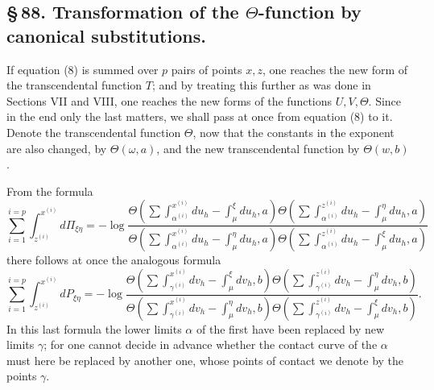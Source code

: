 \documentclass[10pt]{article}
\begin{document}
\subsection*{\S\,88. Transformation of the \(\Theta\)-function by canonical substitutions.}

If equation (8) is summed over \(p\) pairs of points \(x,z\), one reaches the new form of the transcendental function \(T\); and by treating this further as was done in Sections VII and VIII, one reaches the new forms of the functions \(U,V,\Theta\). Since in the end only the last matters, we shall pass at once from equation (8) to it. Denote the transcendental function \(\Theta\), now that the constants in the exponent are also changed, by \(\Theta(\omega,a)\), and the new transcendental function by \(\Theta(w,b)\).

From the formula
\[
\sum_{i=1}^{i=p}\int_{z^{(i)}}^{x^{(i)}}d\Pi_{\xi\eta}
=
-\log
\frac{
\Theta\!\left(\sum\int_{\alpha^{(i)}}^{x^{(i)}}du_h-\int_{\mu}^{\xi}du_h,a\right)
\Theta\!\left(\sum\int_{\alpha^{(i)}}^{z^{(i)}}du_h-\int_{\mu}^{\eta}du_h,a\right)
}{
\Theta\!\left(\sum\int_{\alpha^{(i)}}^{x^{(i)}}du_h-\int_{\mu}^{\eta}du_h,a\right)
\Theta\!\left(\sum\int_{\alpha^{(i)}}^{z^{(i)}}du_h-\int_{\mu}^{\xi}du_h,a\right)
}
\]
there follows at once the analogous formula
\[
\sum_{i=1}^{i=p}\int_{z^{(i)}}^{x^{(i)}}dP_{\xi\eta}
=
-\log
\frac{
\Theta\!\left(\sum\int_{\gamma^{(i)}}^{x^{(i)}}dv_h-\int_{\mu}^{\xi}dv_h,b\right)
\Theta\!\left(\sum\int_{\gamma^{(i)}}^{z^{(i)}}dv_h-\int_{\mu}^{\eta}dv_h,b\right)
}{
\Theta\!\left(\sum\int_{\gamma^{(i)}}^{x^{(i)}}dv_h-\int_{\mu}^{\eta}dv_h,b\right)
\Theta\!\left(\sum\int_{\gamma^{(i)}}^{z^{(i)}}dv_h-\int_{\mu}^{\xi}dv_h,b\right)
}.
\]
In this last formula the lower limits \(\alpha\) of the first have been replaced by new limits \(\gamma\); for one cannot decide in advance whether the contact curve of the \(\alpha\) must here be replaced by another one, whose points of contact we denote by the points \(\gamma\).
\end{document}
